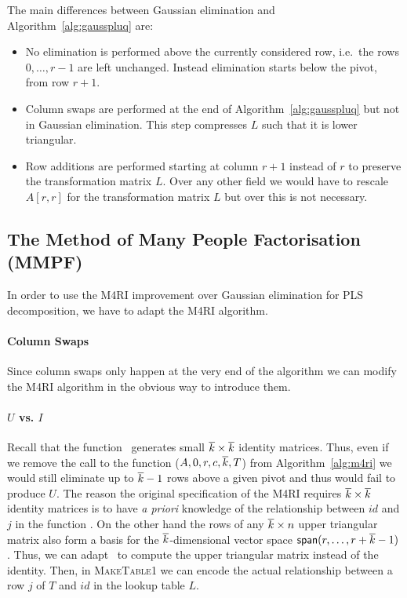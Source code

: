 The main differences between Gaussian elimination and Algorithm~\ref{alg:gausspluq} are:
\begin{itemize}
 \item No elimination is performed above the currently considered row, i.e.~the rows $0,\dots,r-1$ are left unchanged. Instead elimination starts below the pivot, from row $r + 1$.
 \item Column swaps are performed at the end of Algorithm~\ref{alg:gausspluq} but not in Gaussian elimination. This step compresses $L$ such that it is lower triangular.
 \item Row additions are performed starting at column $r + 1$ instead of $r$ to preserve the transformation matrix $L$. Over any other field we would have to rescale $A[r,r]$ for the transformation matrix $L$ but over \GFZ this is not necessary.
\end{itemize}

\subsection{The Method of Many People Factorisation (MMPF)}
In order to use the M4RI improvement over Gaussian elimination for PLS decomposition, we have to adapt the M4RI algorithm.

\paragraph*{Column Swaps}
Since column swaps only happen at the very end of the algorithm we can modify the M4RI algorithm in the obvious way to introduce them.

\paragraph*{$U$ vs. $I$}
Recall that the function \gausssubmatrix\ generates small $\overline{k} \times \overline{k}$ identity matrices. Thus, even if we  remove the call to the function \addrowsfromtable($A,0,r,c,\overline{k},T$) from Algorithm~\ref{alg:m4ri} we would still eliminate up to $\overline{k}-1$ rows above a given pivot and thus would fail to produce $U$. The reason the original specification \cite{Bard2006} of the M4RI requires  $\overline{k} \times \overline{k}$ identity matrices is to have \emph{a priori} know\-ledge of the relationship between $id$ and $j$ in the function \addrowsfromtable. On the other hand the rows of any $\overline{k} \times n$ upper triangular matrix also form a basis for the $\overline{k}$-dimensional vector space $\textsf{span}(r,\dots,r+\overline{k}-1)$. Thus, we can adapt \gausssubmatrix\ to compute the upper triangular matrix instead of the identity. Then, in \textsc{MakeTable1} we can encode the actual relationship between a row $j$ of $T$ and $id$ in the lookup table $L$.


